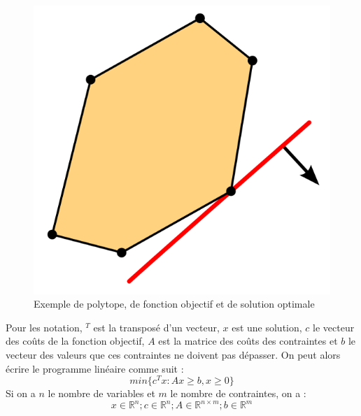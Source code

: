 \documentclass[a4paper,10pt]{article}
\theoremstyle{plain}
\begin{document}
\begin{figure}[htb!]
  \centering
  \includegraphics[scale=0.3]{doc/polytope.png}
  \caption{Exemple de polytope, de fonction objectif et de solution optimale}
  \label{fig:polytope}
\end{figure}

Pour les notation, $^T$ est la transposé d'un vecteur, $x$ est une solution, $c$ le vecteur des coûts de la fonction objectif, $A$ est la matrice des coûts des contraintes et $b$ le vecteur des valeurs que ces contraintes ne doivent pas dépasser. On peut alors écrire le programme linéaire comme suit : $$ min \{ c^Tx : Ax \geq b,x \geq 0 \} $$
Si on a $n$ le nombre de variables et $m$ le nombre de contraintes, on a : $$x\in \mathbb{R}^n ; c\in \mathbb{R}^n ; A\in \mathbb{R}^{n \times m} ; b\in \mathbb{R}^m$$
\end{document}
